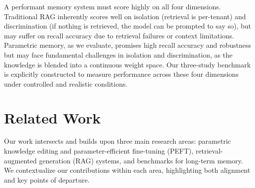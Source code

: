 \documentclass[conference]{IEEEtran}
\begin{document}
A performant memory system must score highly on all four dimensions. Traditional RAG inherently scores well on isolation (retrieval is per-tenant) and discrimination (if nothing is retrieved, the model can be prompted to say so), but may suffer on recall accuracy due to retrieval failures or context limitations. Parametric memory, as we evaluate, promises high recall accuracy and robustness but may face fundamental challenges in isolation and discrimination, as the knowledge is blended into a continuous weight space. Our three-study benchmark is explicitly constructed to measure performance across these four dimensions under controlled and realistic conditions.

\section{Related Work}
Our work intersects and builds upon three main research areas: parametric knowledge editing and parameter-efficient fine-tuning (PEFT), retrieval-augmented generation (RAG) systems, and benchmarks for long-term memory. We contextualize our contributions within each area, highlighting both alignment and key points of departure.
\end{document}
